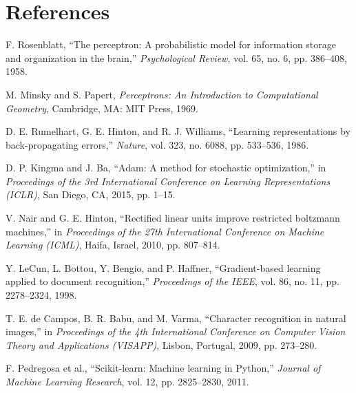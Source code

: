 \documentclass[12pt,a4paper]{article}
\begin{document}
\section{References}
\begin{enumerate}[label={[\arabic*]},noitemsep]
    \item F. Rosenblatt, ``The perceptron: A probabilistic model for information storage and organization in the brain,'' \textit{Psychological Review}, vol. 65, no. 6, pp. 386--408, 1958.
    \item M. Minsky and S. Papert, \textit{Perceptrons: An Introduction to Computational Geometry}, Cambridge, MA: MIT Press, 1969.
    \item D. E. Rumelhart, G. E. Hinton, and R. J. Williams, ``Learning representations by back-propagating errors,'' \textit{Nature}, vol. 323, no. 6088, pp. 533--536, 1986.
    \item D. P. Kingma and J. Ba, ``Adam: A method for stochastic optimization,'' in \textit{Proceedings of the 3rd International Conference on Learning Representations (ICLR)}, San Diego, CA, 2015, pp. 1--15.
    \item V. Nair and G. E. Hinton, ``Rectified linear units improve restricted boltzmann machines,'' in \textit{Proceedings of the 27th International Conference on Machine Learning (ICML)}, Haifa, Israel, 2010, pp. 807--814.
    \item Y. LeCun, L. Bottou, Y. Bengio, and P. Haffner, ``Gradient-based learning applied to document recognition,'' \textit{Proceedings of the IEEE}, vol. 86, no. 11, pp. 2278--2324, 1998.
    \item T. E. de Campos, B. R. Babu, and M. Varma, ``Character recognition in natural images,'' in \textit{Proceedings of the 4th International Conference on Computer Vision Theory and Applications (VISAPP)}, Lisbon, Portugal, 2009, pp. 273--280.
    \item F. Pedregosa et al., ``Scikit-learn: Machine learning in Python,'' \textit{Journal of Machine Learning Research}, vol. 12, pp. 2825--2830, 2011.
\end{enumerate}
\end{document}
